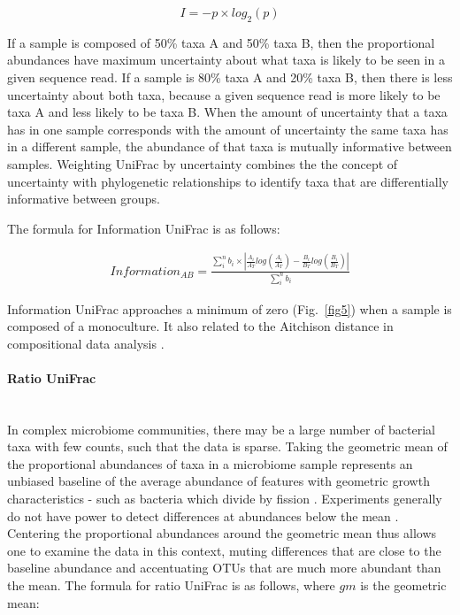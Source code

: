 \documentclass[10pt,letterpaper]{article}
\begin{document}
\begin{equation}\label{eq:schemeP} 
I = - p  \times log_{2}(p)
\end{equation}

If a sample is composed of 50\% taxa A and 50\% taxa B, then the proportional abundances have maximum uncertainty about what taxa is likely to be seen in a given sequence read. If a sample is 80\% taxa A and 20\% taxa B, then there is less uncertainty about both taxa, because a given sequence read is more likely to be taxa A and less likely to be taxa B. When the amount of uncertainty that a taxa has in one sample corresponds with the amount of uncertainty the same taxa has in a different sample, the abundance of that taxa is mutually informative between samples. Weighting UniFrac by uncertainty combines the the concept of uncertainty with phylogenetic relationships to identify taxa that are differentially informative between groups.

The formula for Information UniFrac is as follows:

\begin{align*}
Information_{AB} = \frac{\sum_{i}^{n} b_{i} \times \left| \frac{A_{i}}{A_{T}}log\left(\frac{A_{i}}{A_{T}}\right) - \frac{B_{i}}{B_{T}}log\left(\frac{B_{i}}{B_{T}}\right) \right|}{\sum_{i}^{n} b_{i}}
\end{align*}

Information UniFrac approaches a minimum of zero (Fig.~\ref{fig5}) when a sample is composed of a monoculture. It also related to the Aitchison distance in compositional data analysis \cite{egozcue2011evidence}.

\paragraph{Ratio UniFrac}\mbox{}\\
In complex microbiome communities, there may be a large number of bacterial taxa with few counts, such that the data is sparse. Taking the geometric mean of the proportional abundances of taxa in a microbiome sample represents an unbiased baseline of the average abundance of features with geometric growth characteristics - such as bacteria which divide by fission \cite{aitchison1982statistical}. Experiments generally do not have power to detect differences at abundances below the mean \cite{fernandes2013anova}. Centering the proportional abundances around the geometric mean thus allows one to examine the data in this context, muting differences that are close to the baseline abundance and accentuating OTUs that are much more abundant than the mean. The formula for ratio UniFrac is as follows, where $gm$ is the geometric mean:
\end{document}
